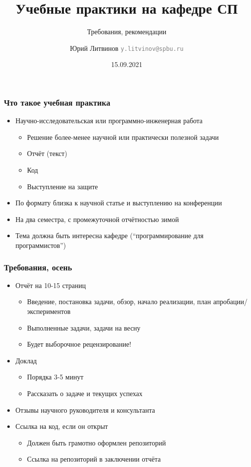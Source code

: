 \documentclass[xetex,mathserif,serif]{beamer}
\title{Учебные практики на кафедре СП}
\subtitle{Требования, рекомендации}
\author[Юрий Литвинов]{Юрий Литвинов \newline \textcolor{gray}{\small\texttt{y.litvinov@spbu.ru}}}
\date{15.09.2021}
\begin{document}
    
    \frame{\titlepage}

    \begin{frame}
        \frametitle{Что такое учебная практика}
        \begin{itemize}
            \item Научно-исследовательская или программно-инженерная работа
            \begin{itemize}
                \item Решение более-менее научной или практически полезной задачи
                \item Отчёт (текст)
                \item Код
                \item Выступление на защите
            \end{itemize}
            \item По формату близка к научной статье и выступлению на конференции
            \item На два семестра, с промежуточной отчётностью зимой
            \item Тема должна быть интересна кафедре (``программирование для программистов'')
        \end{itemize}
    \end{frame}

    \begin{frame}
        \frametitle{Требования, осень}
        \begin{itemize}
            \item Отчёт на 10-15 страниц
            \begin{itemize}
                \item Введение, постановка задачи, обзор, начало реализации, план апробации/экспериментов
                \item Выполненные задачи, задачи на весну
                \item Будет выборочное рецензирование!
            \end{itemize}
            \item Доклад
            \begin{itemize}
                \item Порядка 3-5 минут
                \item Рассказать о задаче и текущих успехах
            \end{itemize}
            \item Отзывы научного руководителя и консультанта
            \item Ссылка на код, если он открыт
            \begin{itemize}
                \item Должен быть грамотно оформлен репозиторий
                \item Ссылка на репозиторий в заключении отчёта
            \end{itemize}
        \end{itemize}
    \end{frame}
\end{document}
